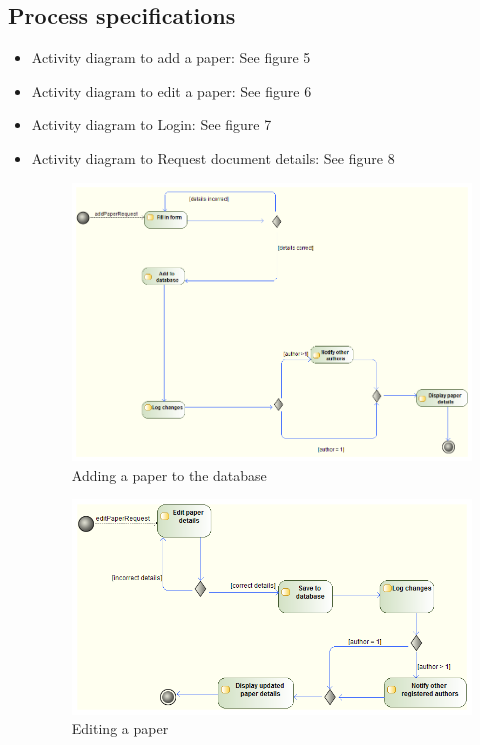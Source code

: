 \documentclass[english]{article}
\begin{document}
		\subsection{Process specifications}
			\begin{itemize}
				\item Activity diagram to add a paper: See figure 5
				\item Activity diagram to edit a paper: See figure 6
				\item Activity diagram to Login: See figure 7
				\item Activity diagram to Request document details: See figure 8
				\begin{figure}
					\includegraphics[width=\linewidth]{Activity diagram-Add a paper.png}
					\caption{Adding a paper to the database}
				\end{figure}
				\begin{figure}
					\includegraphics[width=\linewidth]{Activity diagram_Edit a paper.png}
					\caption{Editing a paper}

\end{figure}
\end{itemize}
\end{document}
